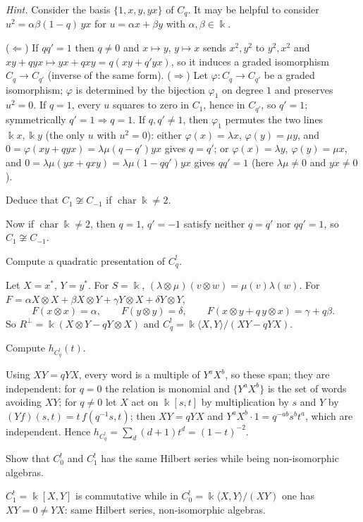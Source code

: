 \documentclass[11pt,a4paper]{exam}
\newcommand{\kk}{\Bbbk}
\begin{document}
\begin{questions}
\begin{parts}
\begin{subparts}
\emph{Hint.} Consider the basis $\{1,x,y,yx\}$ of $C_q$.  It may be helpful to consider $u^2=\alpha\beta(1-q)\,yx$ for $u=\alpha x+\beta y$ with $\alpha,\beta\in\Bbbk$.
\begin{solution}
($\Leftarrow$) If $qq'=1$ then $q\neq0$ and $x\mapsto y$, $y\mapsto x$ sends $x^2,y^2$ to $y^2,x^2$ and $xy+qyx\mapsto yx+qxy=q(xy+q'yx)$, so it induces a graded isomorphism $C_q\to C_{q'}$ (inverse of the same form).
($\Rightarrow$) Let $\varphi:C_q\to C_{q'}$ be a graded isomorphism; $\varphi$ is determined by the bijection $\varphi_1$ on degree $1$ and preserves $u^2=0$.
If $q=1$, every $u$ squares to zero in $C_1$, hence in $C_{q'}$, so $q'=1$; symmetrically $q'=1\Rightarrow q=1$.
If $q,q'\neq1$, then $\varphi_1$ permutes the two lines $\kk x,\kk y$ (the only $u$ with $u^2=0$):
either $\varphi(x)=\lambda x$, $\varphi(y)=\mu y$, and $0=\varphi(xy+qyx)=\lambda\mu(q-q')yx$ gives $q=q'$; or $\varphi(x)=\lambda y$, $\varphi(y)=\mu x$, and $0=\lambda\mu(yx+qxy)=\lambda\mu(1-qq')yx$ gives $qq'=1$ (here $\lambda\mu\neq0$ and $yx\neq0$).

\end{solution}
\subpart Deduce that $C_1\not\cong C_{-1}$ if $\operatorname{char}\kk\neq2$.
\begin{solution}
Now if $\operatorname{char}\kk\neq2$, then $q=1$, $q'=-1$ satisfy neither $q=q'$ nor $qq'=1$, so $C_1\not\cong C_{-1}$.
\end{solution}
\subpart Compute a quadratic presentation of $C_q^!$.
\begin{solution}
Let $X=x^*$, $Y=y^*$.
For $S=\kk$, $(\lambda\otimes\mu)(v\otimes w)=\mu(v)\lambda(w)$. For $F=\alpha X\otimes X+\beta X\otimes Y+\gamma Y\otimes X+\delta Y\otimes Y$,
\[
  F(x\otimes x)=\alpha,\qquad F(y\otimes y)=\delta,\qquad F(x\otimes y+q\,y\otimes x)=\gamma+q\beta.
\]
So $R^\perp=\kk(X\otimes Y-qY\otimes X)$ and $C_q^!=\kk\langle X,Y\rangle/(XY-qYX)$.
\end{solution}
\subpart Compute $h_{C_q^!}(t)$.
\begin{solution}
Using $XY=qYX$, every word is a multiple of $Y^aX^b$, so these span; they are independent:
for $q=0$ the relation is monomial and $\{Y^aX^b\}$ is the set of words avoiding $XY$; for $q\neq0$ let $X$ act on $\kk[s,t]$ by multiplication by $s$ and $Y$ by $(Yf)(s,t)=t\,f(q^{-1}s,t)$; then $XY=qYX$ and $Y^aX^b\cdot1=q^{-ab}s^bt^a$, which are independent.
Hence $h_{C_q^!}=\sum_d(d+1)t^d=(1-t)^{-2}$.
\end{solution}
\subpart Show that $C_0^!$ and $C_1^!$ has the same Hilbert series while being non-isomorphic algebras.
\begin{solution}
$C_1^!=\kk[X,Y]$ is commutative while in $C_0^!=\kk\langle X,Y\rangle/(XY)$ one has $XY=0\neq YX$: same Hilbert series, non-isomorphic algebras.
\end{solution}
\end{subparts}


\end{parts}
\end{questions}
\end{document}
